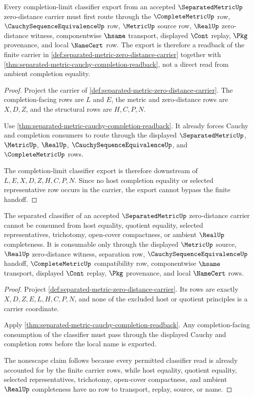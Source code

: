 \begin{theorem}
\label{thm:separatedmetric-root-completion-limit-handoff}
Every completion-limit classifier export from an accepted $\SeparatedMetricUp$ zero-distance carrier must first route through the $\CompleteMetricUp$ row, $\CauchySequenceEquivalenceUp$ row, $\MetricUp$ source row, $\RealUp$ zero-distance witness, componentwise $\hsame$ transport, displayed $\Cont$ replay, $\Pkg$ provenance, and local $\NameCert$ row. The export is therefore a readback of the finite carrier in \autoref{def:separated-metric-zero-distance-carrier} together with \autoref{thm:separated-metric-cauchy-completion-readback}, not a direct read from ambient completion equality.
\end{theorem}
\begin{proof}
Project the carrier of \autoref{def:separated-metric-zero-distance-carrier}. The completion-facing rows are $L$ and $E$, the metric and zero-distance rows are $X,D,Z$, and the structural rows are $H,C,P,N$.

Use \autoref{thm:separated-metric-cauchy-completion-readback}. It already forces Cauchy and completion consumers to route through the displayed $\SeparatedMetricUp$, $\MetricUp$, $\RealUp$, $\CauchySequenceEquivalenceUp$, and $\CompleteMetricUp$ rows.

The completion-limit classifier export is therefore downstream of $L,E,X,D,Z,H,C,P,N$. Since no host completion equality or selected representative row occurs in the carrier, the export cannot bypass the finite handoff.
\end{proof}

\begin{theorem}
\label{thm:separatedmetric-root-classifier-nonescape}
The separated classifier of an accepted $\SeparatedMetricUp$ zero-distance carrier cannot be consumed from host equality, quotient equality, selected representatives, trichotomy, open-cover compactness, or ambient $\RealUp$ completeness. It is consumable only through the displayed $\MetricUp$ source, $\RealUp$ zero-distance witness, separation row, $\CauchySequenceEquivalenceUp$ handoff, $\CompleteMetricUp$ compatibility row, componentwise $\hsame$ transport, displayed $\Cont$ replay, $\Pkg$ provenance, and local $\NameCert$ rows.
\end{theorem}
\begin{proof}
Project \autoref{def:separated-metric-zero-distance-carrier}. Its rows are exactly $X,D,Z,E,L,H,C,P,N$, and none of the excluded host or quotient principles is a carrier coordinate.

Apply \autoref{thm:separated-metric-cauchy-completion-readback}. Any completion-facing consumption of the classifier must pass through the displayed Cauchy and completion rows before the local name is exported.

The nonescape claim follows because every permitted classifier read is already accounted for by the finite carrier rows, while host equality, quotient equality, selected representatives, trichotomy, open-cover compactness, and ambient $\RealUp$ completeness have no row to transport, replay, source, or name.
\end{proof}
